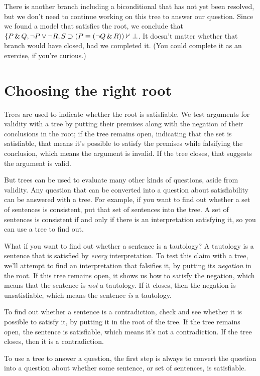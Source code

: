There is another branch including a biconditional that has not yet been resolved, but we don't need to continue working on this tree to answer our question. Since we found a model that satisfies the root, we conclude that $\{P \,\&\, Q, \neg P \vee \neg R, S \supset (P \equiv (\neg Q \,\&\, R)) \nvdash{}\bot$. It doesn't matter whether that branch would have closed, had we completed it. (You could complete it as an exercise, if you're curious.)

\section{Choosing the right root}
\label{sec.sl.treeroots}

Trees are used to indicate whether the root is satisfiable. We test arguments for validity with a tree by putting their premises along with the negation of their conclusions in the root; if the tree remains open, indicating that the set is satisfiable, that means it's possible to satisfy the premises while falsifying the conclusion, which means the argument is invalid. If the tree closes, that suggests the argument is valid.

But trees can be used to evaluate many other kinds of questions, aside from validity. Any question that can be converted into a question about satisfiability can be answered with a tree. For example, if you want to find out whether a set of sentences is consistent, put that set of sentences into the tree. A set of sentences is consistent if and only if there is an interpretation satisfying it, so you can use a tree to find out.

What if you want to find out whether a sentence is a tautology? A tautology is a sentence that is satisfied by \emph{every} interpretation. To test this claim with a tree, we'll attempt to find an interpretation that falsifies it, by putting its \emph{negation} in the root. If this tree remains open, it shows us how to satisfy the negation, which means that the sentence is \emph{not} a tautology. If it closes, then the negation is unsatisfiable, which means the sentence \emph{is} a tautology.

To find out whether a sentence is a contradiction, check and see whether it is possible to satisfy it, by putting it in the root of the tree. If the tree remains open, the sentence is satisfiable, which means it's not a contradiction. If the tree closes, then it is a contradiction.

To use a tree to answer a question, the first step is always to convert the question into a question about whether some sentence, or set of sentences, is satisfiable. 


